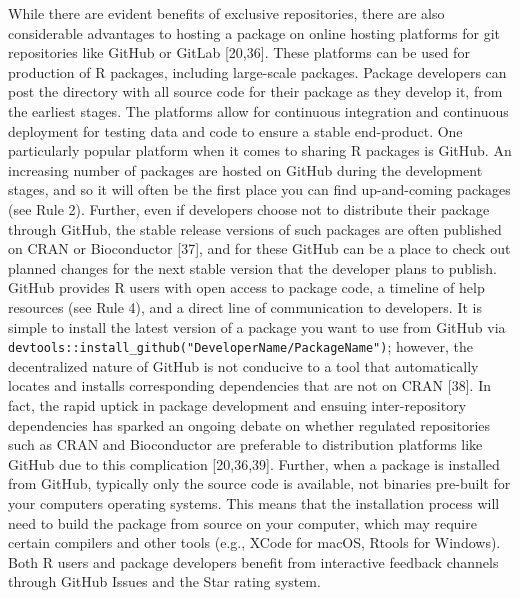\documentclass[10pt,letterpaper]{article}
\begin{document}
While there are evident benefits of exclusive repositories, there are
also considerable advantages to hosting a package on online hosting
platforms for git repositories like GitHub or GitLab {[}20,36{]}. These
platforms can be used for production of R packages, including
large-scale packages. Package developers can post the directory with all
source code for their package as they develop it, from the earliest
stages. The platforms allow for continuous integration and continuous
deployment for testing data and code to ensure a stable end-product. One
particularly popular platform when it comes to sharing R packages is
GitHub. An increasing number of packages are hosted on GitHub during the
development stages, and so it will often be the first place you can find
up-and-coming packages (see Rule 2). Further, even if developers choose
not to distribute their package through GitHub, the stable release
versions of such packages are often published on CRAN or Bioconductor
{[}37{]}, and for these GitHub can be a place to check out planned
changes for the next stable version that the developer plans to publish.
GitHub provides R users with open access to package code, a timeline of
help resources (see Rule 4), and a direct line of communication to
developers. It is simple to install the latest version of a package you
want to use from GitHub via
\texttt{devtools::install\_github("DeveloperName/PackageName")};
however, the decentralized nature of GitHub is not conducive to a tool
that automatically locates and installs corresponding dependencies that
are not on CRAN {[}38{]}. In fact, the rapid uptick in package
development and ensuing inter-repository dependencies has sparked an
ongoing debate on whether regulated repositories such as CRAN and
Bioconductor are preferable to distribution platforms like GitHub due to
this complication {[}20,36,39{]}. Further, when a package is installed
from GitHub, typically only the source code is available, not binaries
pre-built for your computers operating systems. This means that the
installation process will need to build the package from source on your
computer, which may require certain compilers and other tools (e.g.,
XCode for macOS, Rtools for Windows). Both R users and package
developers benefit from interactive feedback channels through GitHub
Issues and the Star rating system.
\end{document}
